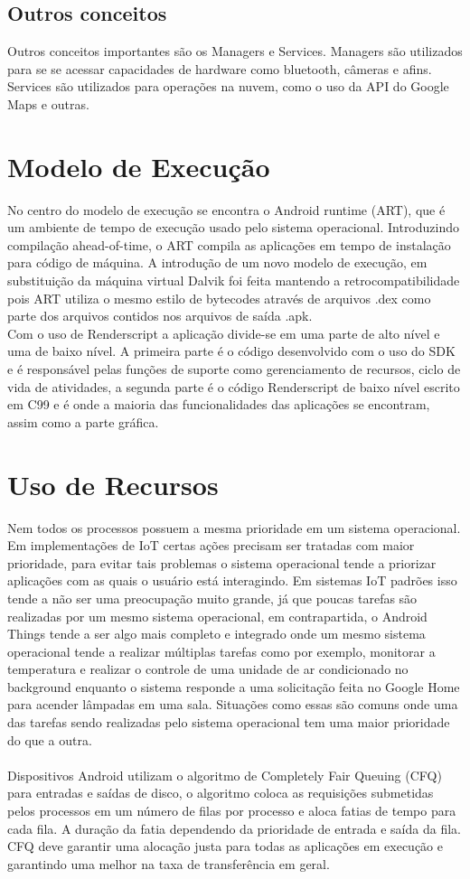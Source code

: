 \documentclass[12pt]{article}
\begin{document}
\subsection{Outros conceitos}
Outros conceitos importantes são os Managers e Services. Managers são utilizados para se se acessar capacidades de hardware como bluetooth, câmeras e afins. 
\\Services são utilizados para operações na nuvem, como o uso da API do Google Maps e outras.
\section{Modelo de Execução}
No centro do modelo de execução se encontra o Android runtime (ART), que é um ambiente de tempo de execução usado pelo sistema operacional. Introduzindo compilação ahead-of-time, o ART compila as aplicações em tempo de instalação para código de máquina. A introdução de um novo modelo de execução, em substituição da máquina virtual Dalvik foi feita mantendo a retrocompatibilidade pois ART utiliza o mesmo estilo de bytecodes através de arquivos .dex como parte dos arquivos contidos nos arquivos de saída .apk.
\\Com o uso de Renderscript a aplicação divide-se em uma parte de alto nível e uma de baixo nível. A primeira parte é o código desenvolvido com o uso do SDK e é responsável pelas funções de suporte como gerenciamento de recursos, ciclo de vida de atividades, a segunda parte é o código Renderscript de baixo nível escrito em C99 e é onde a maioria das funcionalidades das aplicações se encontram, assim como a parte gráfica.
\section{Uso de Recursos}
Nem todos os processos possuem a mesma prioridade em um sistema operacional. Em implementações de IoT certas ações precisam ser tratadas com maior prioridade, para evitar tais problemas o sistema operacional tende a priorizar aplicações com as quais o usuário está interagindo. Em sistemas IoT padrões isso tende a não ser uma preocupação muito grande, já que poucas tarefas são realizadas por um mesmo sistema operacional, em contrapartida, o Android Things tende a ser algo mais completo e integrado onde um mesmo sistema operacional tende a realizar múltiplas tarefas como por exemplo, monitorar a temperatura e realizar o controle de uma unidade de ar condicionado no background enquanto o sistema responde a uma solicitação feita no Google Home para acender lâmpadas em uma sala. Situações como essas são comuns onde uma das tarefas sendo realizadas pelo sistema operacional tem uma maior prioridade do que a outra.
\\\\Dispositivos Android utilizam o algoritmo de Completely Fair Queuing (CFQ) \cite{wiki:cfq} para entradas e saídas de disco, o algoritmo coloca as requisições submetidas pelos processos em um número de filas por processo e aloca fatias de tempo para cada fila. A duração da fatia dependendo da prioridade de entrada e saída da fila. CFQ deve garantir uma alocação justa para todas as aplicações em execução e garantindo uma melhor na taxa de transferência em geral.
\end{document}
